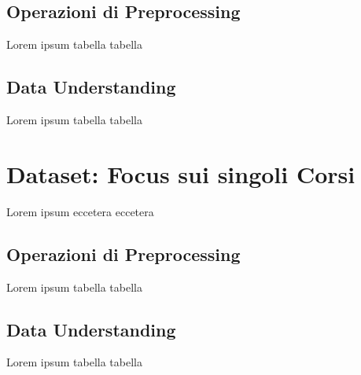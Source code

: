 	\subsection{Operazioni di Preprocessing}
		Lorem ipsum tabella tabella

	\subsection{Data Understanding}
		Lorem ipsum tabella tabella

\section{Dataset: Focus sui singoli Corsi}
	Lorem ipsum eccetera eccetera  

	\subsection{Operazioni di Preprocessing}
		Lorem ipsum tabella tabella

	\subsection{Data Understanding}
		Lorem ipsum tabella tabella
